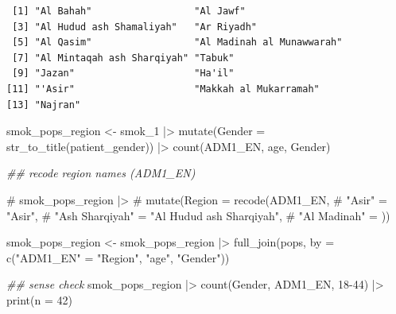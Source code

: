 \documentclass[
  letterpaper,
  DIV=11,
  numbers=noendperiod]{scrreprt}
\newenvironment{Shaded}{\begin{snugshade}}{\end{snugshade}}
\newcommand{\AttributeTok}[1]{\textcolor[rgb]{0.40,0.45,0.13}{#1}}
\newcommand{\CommentTok}[1]{\textcolor[rgb]{0.37,0.37,0.37}{#1}}
\newcommand{\DecValTok}[1]{\textcolor[rgb]{0.68,0.00,0.00}{#1}}
\newcommand{\DocumentationTok}[1]{\textcolor[rgb]{0.37,0.37,0.37}{\textit{#1}}}
\newcommand{\FunctionTok}[1]{\textcolor[rgb]{0.28,0.35,0.67}{#1}}
\newcommand{\NormalTok}[1]{\textcolor[rgb]{0.00,0.23,0.31}{#1}}
\newcommand{\OtherTok}[1]{\textcolor[rgb]{0.00,0.23,0.31}{#1}}
\newcommand{\SpecialCharTok}[1]{\textcolor[rgb]{0.37,0.37,0.37}{#1}}
\newcommand{\StringTok}[1]{\textcolor[rgb]{0.13,0.47,0.30}{#1}}
\begin{document}
\begin{Shaded}
\end{Shaded}

\begin{verbatim}
 [1] "Al Bahah"                  "Al Jawf"                  
 [3] "Al Hudud ash Shamaliyah"   "Ar Riyadh"                
 [5] "Al Qasim"                  "Al Madinah al Munawwarah" 
 [7] "Al Mintaqah ash Sharqiyah" "Tabuk"                    
 [9] "Jazan"                     "Ha'il"                    
[11] "'Asir"                     "Makkah al Mukarramah"     
[13] "Najran"                   
\end{verbatim}

\begin{Shaded}
\begin{Highlighting}[]
\NormalTok{smok\_pops\_region }\OtherTok{\textless{}{-}}\NormalTok{ smok\_1 }\SpecialCharTok{|\textgreater{}}
    \FunctionTok{mutate}\NormalTok{(}\AttributeTok{Gender =} \FunctionTok{str\_to\_title}\NormalTok{(patient\_gender)) }\SpecialCharTok{|\textgreater{}}
    \FunctionTok{count}\NormalTok{(ADM1\_EN, age, Gender) }


\DocumentationTok{\#\# recode region names (ADM1\_EN)}

\CommentTok{\# smok\_pops\_region |\textgreater{}}
\CommentTok{\#     mutate(Region = recode(ADM1\_EN, }
\CommentTok{\#                            "\textasciigrave{}Asir" = "\textquotesingle{}Asir", }
\CommentTok{\#                            "Ash Sharqiyah" = "Al Hudud ash Sharqiyah", }
\CommentTok{\#                            "Al Madinah" = ))}

\NormalTok{smok\_pops\_region }\OtherTok{\textless{}{-}}\NormalTok{ smok\_pops\_region }\SpecialCharTok{|\textgreater{}}
    \FunctionTok{full\_join}\NormalTok{(pops, }\AttributeTok{by =} \FunctionTok{c}\NormalTok{(}\StringTok{"ADM1\_EN"} \OtherTok{=} \StringTok{"Region"}\NormalTok{, }\StringTok{"age"}\NormalTok{, }\StringTok{"Gender"}\NormalTok{)) }



\DocumentationTok{\#\# sense check}
\NormalTok{smok\_pops\_region }\SpecialCharTok{|\textgreater{}}
    \FunctionTok{count}\NormalTok{(Gender, ADM1\_EN, }\StringTok{\textasciigrave{}}\AttributeTok{18{-}44}\StringTok{\textasciigrave{}}\NormalTok{) }\SpecialCharTok{|\textgreater{}}
    \FunctionTok{print}\NormalTok{(}\AttributeTok{n =} \DecValTok{42}\NormalTok{)}
\end{Highlighting}
\end{Shaded}
\end{document}

